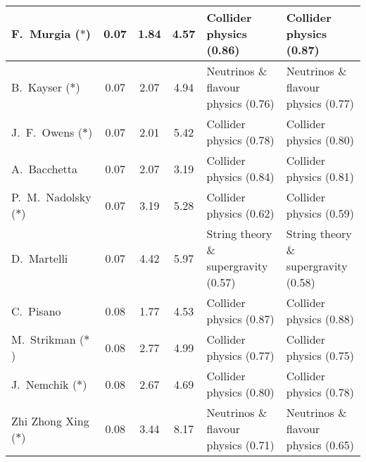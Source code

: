 \begin{table}[H]
\begin{tabular}{p{}|c|c|c|b{}|b{}}
     F.~Murgia ($\ast$) &  0.07 &          1.84 &          4.57 &              Collider physics (0.86) &              Collider physics (0.87)\\ \hline
     B.~Kayser ($\ast$) &  0.07 &          2.07 &          4.94 &  Neutrinos \& flavour physics (0.76) &  Neutrinos \& flavour physics (0.77)\\ \hline
   J.~F.~Owens ($\ast$) &  0.07 &          2.01 &          5.42 &              Collider physics (0.78) &              Collider physics (0.80)\\ \hline
           A.~Bacchetta &  0.07 &          2.07 &          3.19 &              Collider physics (0.84) &              Collider physics (0.81)\\ \hline
P.~M.~Nadolsky ($\ast$) &  0.07 &          3.19 &          5.28 &              Collider physics (0.62) &              Collider physics (0.59)\\ \hline
            D.~Martelli &  0.07 &          4.42 &          5.97 & String theory \& supergravity (0.57) & String theory \& supergravity (0.58)\\ \hline
              C.~Pisano &  0.08 &          1.77 &          4.53 &              Collider physics (0.87) &              Collider physics (0.88)\\ \hline
   M.~Strikman ($\ast$) &  0.08 &          2.77 &          4.99 &              Collider physics (0.77) &              Collider physics (0.75)\\ \hline
    J.~Nemchik ($\ast$) &  0.08 &          2.67 &          4.69 &              Collider physics (0.80) &              Collider physics (0.78)\\ \hline
Zhi Zhong Xing ($\ast$) &  0.08 &          3.44 &          8.17 &  Neutrinos \& flavour physics (0.71) &  Neutrinos \& flavour physics (0.65)\\ \hline
\bottomrule
\end{tabular}\normalsize\renewcommand{\arraystretch}{1}
\end{table}

